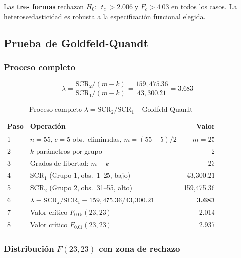 \documentclass[12pt,a4paper]{article}
\begin{document}
\begin{cajarechazo}[title=Decisión -- Glejser (tres formas)]
Las \textbf{tres formas} rechazan $H_0$: $|t_c| > 2.006$ y $F_c > 4.03$ en todos los casos.
La heteroscedasticidad es robusta a la especificación funcional elegida.
\end{cajarechazo}

\subsection{Prueba de Goldfeld-Quandt}

\subsubsection{Proceso completo}

\[
  \lambda = \frac{\text{SCR}_2/(m-k)}{\text{SCR}_1/(m-k)}
          = \frac{159{,}475.36}{43{,}300.21} = \mathbf{3.683}
\]

\begin{table}[H]
\centering
\caption{Proceso completo $\lambda = \text{SCR}_2/\text{SCR}_1$ -- Goldfeld-Quandt}
\begin{tabular}{llr}
\toprule
\textbf{Paso} & \textbf{Operación} & \textbf{Valor}\\
\midrule
1 & $n=55$, $c=5$ obs.\ eliminadas, $m=(55-5)/2$ & $m=25$\\
2 & $k$ parámetros por grupo & 2\\
3 & Grados de libertad: $m-k$ & 23\\
\midrule
4 & $\text{SCR}_1$ (Grupo 1, obs.\ 1--25, bajo) & 43{,}300.21\\
5 & $\text{SCR}_2$ (Grupo 2, obs.\ 31--55, alto) & 159{,}475.36\\
\midrule
6 & $\lambda = \text{SCR}_2/\text{SCR}_1 = 159{,}475.36/43{,}300.21$ & \textbf{3.683}\\
\midrule
7 & Valor crítico $F_{0.05}(23,23)$ & 2.014\\
8 & Valor crítico $F_{0.01}(23,23)$ & 2.937\\
\bottomrule
\end{tabular}
\end{table}

\subsubsection{Distribución $F(23,23)$ con zona de rechazo}
\end{document}
